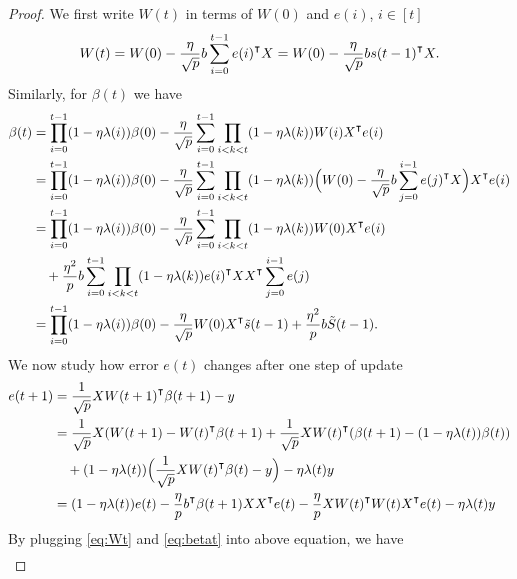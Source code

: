 \begin{proof}
We first write $W(t)$ in terms of $W(0)$ and $e(i)$, $i\in[t]$
\begin{equation}
\label{eq:Wt}
    W(t) = W(0) -\frac{\eta}{\sqrt p} b\sum_{i=0}^{t-1}e(i)\transpose X = W(0) -\frac{\eta}{\sqrt p} bs(t-1)\transpose X.
\end{equation}
Similarly, for $\beta(t)$ we have
\begin{equation}
\label{eq:betat}
\begin{aligned}
    \beta(t) &=\prod_{i=0}^{t-1}(1-\eta\lambda(i))\beta(0)-\frac{\eta}{\sqrt p}\sum_{i=0}^{t-1}\prod_{i<k<t}(1-\eta\lambda(k))W(i)X\transpose e(i) \\
    &=\prod_{i=0}^{t-1}(1-\eta\lambda(i))\beta(0)-\frac{\eta}{\sqrt p}\sum_{i=0}^{t-1}\prod_{i<k<t}(1-\eta\lambda(k))\Big(W(0) -\frac{\eta}{\sqrt p} b\sum_{j=0}^{i-1}e(j)\transpose X\Big)X\transpose e(i) \\
    &=\prod_{i=0}^{t-1}(1-\eta\lambda(i))\beta(0)-\frac{\eta}{\sqrt p}\sum_{i=0}^{t-1}\prod_{i<k<t}(1-\eta\lambda(k))W(0)X\transpose e(i)\\
    &\quad + \frac{\eta^2}{p}b\sum_{i=0}^{t-1}\prod_{i<k<t}(1-\eta\lambda(k))e(i)\transpose XX\transpose \sum_{j=0}^{i-1}e(j) \\
    &=\prod_{i=0}^{t-1}(1-\eta\lambda(i))\beta(0) -\frac{\eta}{\sqrt p}W(0)X\transpose \tilde{s}(t-1) +\frac{\eta^2}{p}b \tilde{S}(t-1).
\end{aligned}
\end{equation}
We now study how error $e(t)$ changes after one step of update
\begin{equation*}
\begin{aligned}
    e(t+1) &= \frac{1}{\sqrt p}XW(t+1)\transpose \beta(t+1)-y \\
    &= \frac{1}{\sqrt p}X(W(t+1)-W(t)\transpose \beta(t+1)+ \frac{1}{\sqrt p}XW(t)\transpose (\beta(t+1)-(1-\eta\lambda(t))\beta(t)) \\
    &\quad +(1-\eta\lambda(t))\Big(\frac{1}{\sqrt p}XW(t)\transpose \beta(t)-y\Big) -\eta\lambda(t)y\\
    &=(1-\eta\lambda(t))e(t) - \frac{\eta}{p}b\transpose\beta(t+1)XX\transpose e(t)  - \frac{\eta}{p}XW(t)\transpose W(t)X\transpose e(t) - \eta\lambda(t)y
\end{aligned}
\end{equation*}
By plugging \eqref{eq:Wt} and \eqref{eq:betat} into above equation, we have
\begin{equation*}   
\begin{aligned}

\end{aligned}
\end{equation*}
\end{proof}
